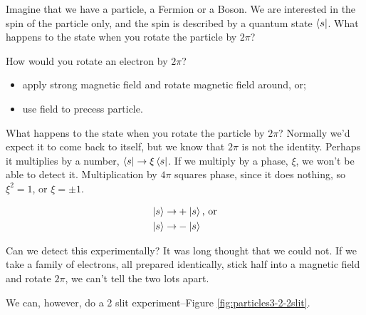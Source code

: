 \documentclass[]{article}
\begin{document}
Imagine that we have a particle, a Fermion or a Boson. We are interested in the spin of the particle only, and the spin is described by a quantum state $\bra{s}$. What happens to the state when you rotate the particle by $2\pi$?

How would you rotate an electron by $2\pi$?

\begin{itemize}
	\item apply strong magnetic field and rotate magnetic field around, or;
	\item use field to precess particle.
\end{itemize}

What happens to the state when you rotate the particle by $2\pi$? Normally we'd expect it to come back to itself, but we know that $2\pi$ is not the identity. Perhaps it multiplies by a number, $\bra{s} \rightarrow \xi \bra{s}$. If we multiply by a phase, $\xi$, we won't be able to detect it. Multiplication by $4\pi$ squares phase, since it does nothing, so $\xi^2=1$, or $\xi=\pm1$.

\begin{align*}
	\ket{s} \rightarrow& +\ket{s} \text{, or}\\
	\ket{s} \rightarrow& -\ket{s}
\end{align*}

Can we detect this experimentally? It was long thought that we could not. If we take a family of electrons, all prepared identically, stick half into a magnetic field and rotate $2\pi$, we can't tell the two lots apart.

We can, however, do a 2 slit experiment\cite{aharonov1967observability}--Figure \ref{fig:particles3-2-2slit}.
\end{document}
